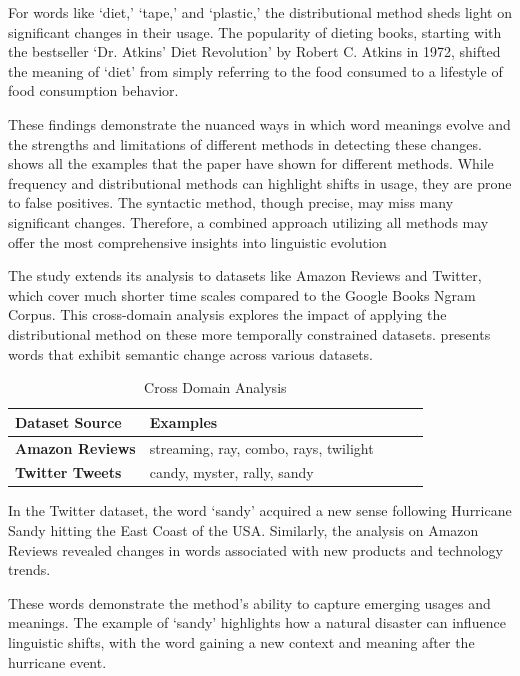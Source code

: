 For words like `diet,' `tape,' and `plastic,' the distributional method sheds light on significant changes in their usage.
The popularity of dieting books, starting with the bestseller `Dr. Atkins’ Diet Revolution' by Robert C. Atkins in 1972, shifted the meaning of `diet' from simply referring to the food consumed to a lifestyle of food consumption behavior.

These findings demonstrate the nuanced ways in which word meanings evolve and the strengths and limitations of different methods in detecting these changes.
 shows all the examples that the paper have shown for different methods.
While frequency and distributional methods can highlight shifts in usage, they are prone to false positives.
The syntactic method, though precise, may miss many significant changes.
Therefore, a combined approach utilizing all methods may offer the most comprehensive insights into linguistic evolution

The study extends its analysis to datasets like Amazon Reviews and Twitter, which cover much shorter time scales compared to the Google Books Ngram Corpus.
This cross-domain analysis explores the impact of applying the distributional method on these more temporally constrained datasets.
 presents words that exhibit semantic change across various datasets.

\begin{table}[tbh]
\begin{tabular}{@{}lllll@{}}
\toprule
\textbf{Dataset Source} & \textbf{Examples}                     &  &  &  \\ \midrule
\textbf{Amazon Reviews} & streaming, ray, combo, rays, twilight &  &  &  \\
\textbf{Twitter Tweets} & candy, myster, rally, sandy           &  &  &  \\ \bottomrule
\end{tabular}
\caption{Cross Domain Analysis}
\label{tab:sources-examples}
\end{table}
\raggedbottom

In the Twitter dataset, the word `sandy' acquired a new sense following Hurricane Sandy hitting the East Coast of the USA\@.
Similarly, the analysis on Amazon Reviews revealed changes in words associated with new products and technology trends.

These words demonstrate the method’s ability to capture emerging usages and meanings.
The example of `sandy' highlights how a natural disaster can influence linguistic shifts, with the word gaining a new context and meaning after the hurricane event.

